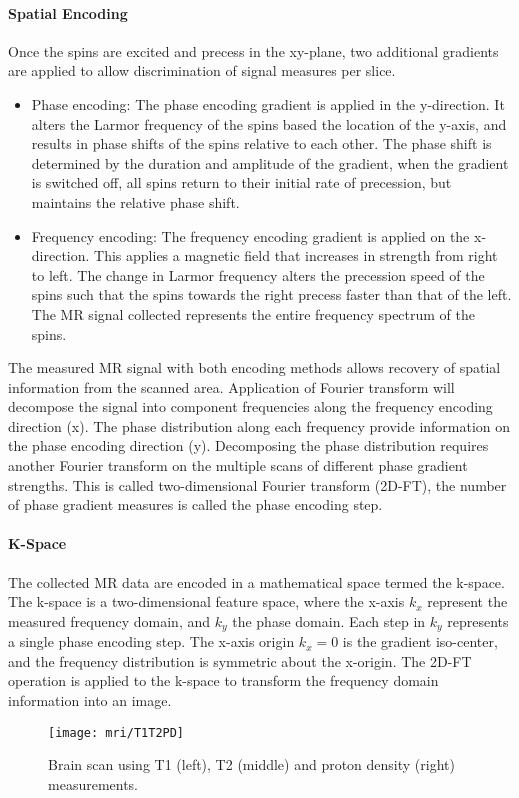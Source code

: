 \paragraph{Spatial Encoding}
Once the spins are excited and precess in the xy-plane, two additional gradients are applied to allow discrimination of signal measures per slice. 

\begin{itemize}
\item Phase encoding: The phase encoding gradient is applied in the y-direction. It alters the Larmor frequency of the spins based the location of the y-axis, and results in phase shifts of the spins relative to each other. The phase shift is determined by the duration and amplitude of the gradient, when the gradient is switched off, all spins return to their initial rate of precession, but maintains the relative phase shift. 
\item Frequency encoding: The frequency encoding gradient is applied on the x-direction. This applies a magnetic field that increases in strength from right to left. The change in Larmor frequency alters the precession speed of the spins such that the spins towards the right precess faster than that of the left. The MR signal collected represents the entire frequency spectrum of the spins. 
\end{itemize}

The measured MR signal with both encoding methods allows recovery of spatial information from the scanned area. Application of Fourier transform will decompose the signal into component frequencies along the frequency encoding direction (x). The phase distribution along each frequency provide information on the phase encoding direction (y). Decomposing the phase distribution requires another Fourier transform on the multiple scans of different phase gradient strengths. This is called two-dimensional Fourier transform (2D-FT), the number of phase gradient measures is called the phase encoding step. 

\paragraph{K-Space}

The collected MR data are encoded in a mathematical space termed the k-space. The k-space is a two-dimensional feature space, where the x-axis $k_x$ represent the measured frequency domain, and $k_y$ the phase domain. Each step in $k_y$ represents a single phase encoding step. The x-axis origin $k_x=0$ is the gradient iso-center, and the frequency distribution is symmetric about the x-origin. The 2D-FT operation is applied to the k-space to transform the frequency domain information into an image. 

\begin{figure}[htb]
\begin{center}
\texttt{[image: mri/T1T2PD]}
\caption{Brain scan using T1 (left), T2 (middle) and proton density (right) measurements.}
\label{fig:T1T2PD}
\end{center}

\end{figure}
